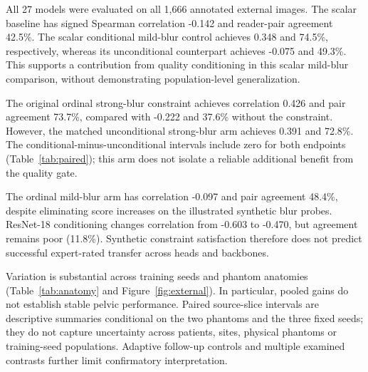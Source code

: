 All 27 models were evaluated on all 1,666 annotated external images. The scalar baseline has signed Spearman correlation -0.142 and reader-pair agreement 42.5\%. The scalar conditional mild-blur control achieves 0.348 and 74.5\%, respectively, whereas its unconditional counterpart achieves -0.075 and 49.3\%. This supports a contribution from quality conditioning in this scalar mild-blur comparison, without demonstrating population-level generalization.

The original ordinal strong-blur constraint achieves correlation 0.426 and pair agreement 73.7\%, compared with -0.222 and 37.6\% without the constraint. However, the matched unconditional strong-blur arm achieves 0.391 and 72.8\%. The conditional-minus-unconditional intervals include zero for both endpoints (Table~\ref{tab:paired}); this arm does not isolate a reliable additional benefit from the quality gate.

The ordinal mild-blur arm has correlation -0.097 and pair agreement 48.4\%, despite eliminating score increases on the illustrated synthetic blur probes. ResNet-18 conditioning changes correlation from -0.603 to -0.470, but agreement remains poor (11.8\%). Synthetic constraint satisfaction therefore does not predict successful expert-rated transfer across heads and backbones.

Variation is substantial across training seeds and phantom anatomies (Table~\ref{tab:anatomy} and Figure~\ref{fig:external}). In particular, pooled gains do not establish stable pelvic performance. Paired source-slice intervals are descriptive summaries conditional on the two phantoms and the three fixed seeds; they do not capture uncertainty across patients, sites, physical phantoms or training-seed populations. Adaptive follow-up controls and multiple examined contrasts further limit confirmatory interpretation.
